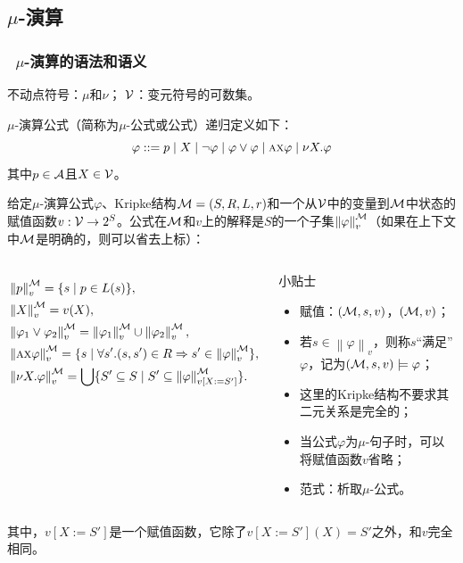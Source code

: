 \documentclass[9pt, CJK]{beamer}
\begin{document}
\subsection{$\mu$-演算}
\begin{frame} 
	\frametitle{~$\mu$-演算的语法和语义}
	{\footnotesize 
		不动点符号：$\mu$和$\nu$；\qquad
		${\cal V}$：变元符号的可数集。 
		\begin{definition}[$\mu$-演算公式]
			$\mu$-演算公式（简称为$\mu$-公式或公式）递归定义如下：
			\[
			\varphi ::=   p\mid  X\mid \neg \varphi\mid \varphi \vee \varphi \mid \textsc{a}\textsc{x} \varphi\mid  \nu X. \varphi
			\]
			其中$p\in {\cal A}$且$X\in {\cal V}$。
		\end{definition}
		\begin{definition}
			给定$\mu$-演算公式$\varphi$、Kripke结构{\em ${\cal M}=(S,R,L,r)$}和一个从${\cal V}$中的变量到${\cal M}$中状态的赋值函数$v: {\cal V} \rightarrow 2^S$。公式在${\cal M}$和$v$上的解释是$S$的一个子集$\left\| \varphi\right\|_v^{{\cal M}}$（如果在上下文中${\cal M}$是明确的，则可以省去上标）：
			\begin{columns}
				\begin{align*}
					& \left \| p\right \|_v^{{\cal M}} = \{s\mid p \in L(s)\}, \\  
					& \left\| X\right\|_v^{{\cal M}} = v(X),\\
					& \left\|\varphi_1 \vee \varphi_2\right\|_v^{{\cal M}} = \left\|\varphi_1\right\|_v^{{\cal M}} \cup \left\|\varphi_2\right\|_v^{{\cal M}},\\ 
					& \left\|\textsc{a} \textsc{x} \varphi\right\|_v^{{\cal M}} = \{s\mid \forall s'. (s, s') \in R \Rightarrow s' \in \left\|\varphi\right\|_v^{{\cal M}}\},\\ 
					& \left\| \nu X. \varphi\right\|_v^{{\cal M}} = \bigcup\{S' \subseteq S \mid S' \subseteq \left\|\varphi\right\|_{v[X:= S']}^{{\cal M}}\}.
				\end{align*}
				{\tiny 
					\begin{block}{{\scriptsize 小贴士}}
						\begin{itemize} 
							\item 赋值：$({\cal M},s,v)$，$({\cal M},v)$；
							\item 若$s\in \left\| \varphi \right\|_v$，则称$s$“满足”$\varphi$，记为$({\cal M}, s, v) \models \varphi$；
							\item 这里的Kripke结构不要求其二元关系是完全的；
							\item 当公式$\varphi$为$\mu$-句子时，可以将赋值函数$v$省略；
							\item 范式：析取$\mu$-公式。
						\end{itemize}
					\end{block}
				} 
			\end{columns}
			
			其中，$v[X:= S']$是一个赋值函数，它除了$v[X:= S'](X)=S'$之外，和$v$完全相同。
		\end{definition}
		 
	}
\end{frame}
\end{document}
